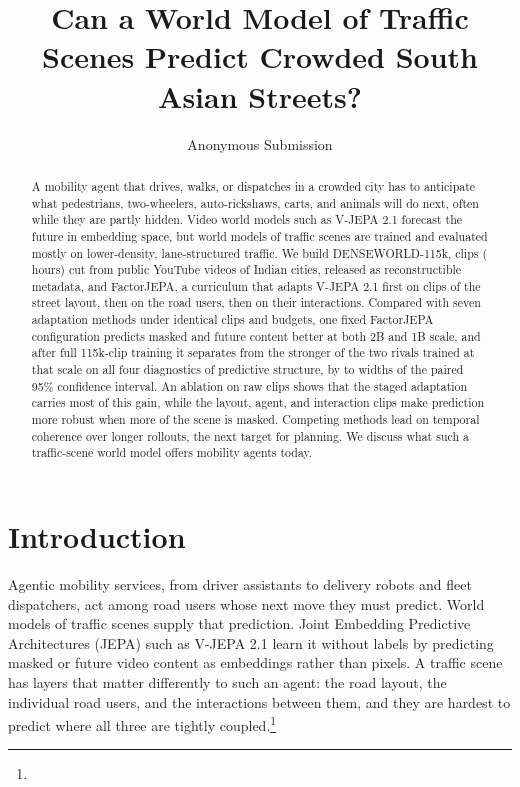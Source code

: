 \documentclass[letterpaper]{article} %
\title{Can a World Model of Traffic Scenes Predict Crowded South Asian Streets?}  %
\author{Anonymous Submission}
\begin{document}
\maketitle

\begin{abstract}
A mobility agent that drives, walks, or dispatches in a crowded city has to anticipate what pedestrians, two-wheelers, auto-rickshaws, carts, and animals will do next, often while they are partly hidden. Video world models such as V-JEPA 2.1 forecast the future in embedding space, but world models of traffic scenes are trained and evaluated mostly on lower-density, lane-structured traffic. We build DENSEWORLD-115k, \nClips{} clips (\nHours{} hours) cut from \nVideos{} public YouTube videos of \nCities{} Indian cities, released as reconstructible metadata, and FactorJEPA, a curriculum that adapts V-JEPA 2.1 first on clips of the street layout, then on the road users, then on their interactions. Compared with seven adaptation methods under identical clips and budgets, one fixed FactorJEPA configuration predicts masked and future content better at both 2B and 1B scale, and after full 115k-clip training it separates from the stronger of the two rivals trained at that scale on all four diagnostics of predictive structure, by \nSepLo{} to \nSepHi{} widths of the paired 95\% confidence interval. An ablation on raw clips shows that the staged adaptation carries most of this gain, while the layout, agent, and interaction clips make prediction more robust when more of the scene is masked. Competing methods lead on temporal coherence over longer rollouts, the next target for planning. We discuss what such a traffic-scene world model offers mobility agents today.
\end{abstract}



\section{Introduction}

Agentic mobility services, from driver assistants to delivery robots and fleet dispatchers, act among road users whose next move they must predict. World models of traffic scenes supply that prediction. Joint Embedding Predictive Architectures (JEPA) such as V-JEPA 2.1 \cite{murlabadia2026vjepa21} learn it without labels by predicting masked or future video content as embeddings rather than pixels. A traffic scene has layers that matter differently to such an agent: the road layout, the individual road users, and the interactions between them, and they are hardest to predict where all three are tightly coupled.\footnote{\disclosure}
\end{document}
